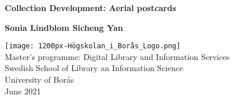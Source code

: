 \begin{titlepage}
	\begin{center}
		\vspace*{1cm}
		
		{\Large \textbf{Collection Development: Aerial postcards}}
		
		\vspace{0.5cm}
	
		
		\vspace{1.5cm}
		
		\textbf{Sonia Lindblom \quad \quad Sicheng Yan}
		
		\vfill
		
		
		
		\vspace{0.8cm}
		
		\texttt{[image: 1200px-Högskolan\_i\_Borås\_Logo.png]}\\
		Master's programme: Digital Library and Information Services\\
		Swedish School of Library an Information Science \\
		University of Borås\\
		June 2021
	
		
	\end{center}
\end{titlepage}